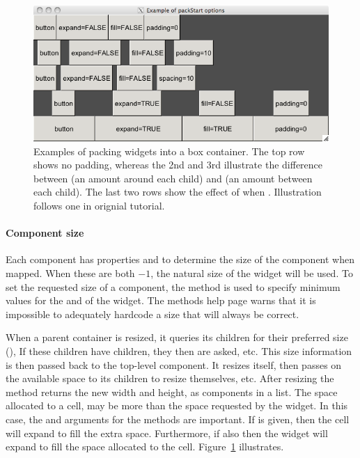 \begin{figure}
  \centering
  \includegraphics[width=.85\textwidth]{ex-RGtk2-pack-start}
  \caption{Examples of packing widgets into a box container. The top
    row shows no padding, whereas the 2nd and 3rd illustrate the
    difference between  (an amount around each child)
    and  (an amount between each child). The last two
    rows show the effect of  when . Illustration
    follows one in orignial \GTK\/ tutorial.}
  \label{fig:RGtk2-pack-start}
\end{figure}




\paragraph{Component size}
Each component has properties  and  to determine the size of the component when mapped. When these are both $-1$, the natural size of the widget will be used. To set the requested size of a component, the method  is used to specify minimum values for the and  of the widget. The methods help page warns that it is impossible to adequately hardcode a size that will always be correct.

When a parent container is resized, it queries its children for their
preferred size (), If these children
have children, they then are asked, etc. This size
information is then passed back to the top-level component. It resizes
itself, then passes on the available space to its children to resize
themselves, etc. After resizing the 
method returns the new width and height, as components in a list.
The space allocated to a cell, may be more than the space requested by
the widget. In this case, the  and
 arguments for the  methods
are important. If  is given, then the cell will
expand to fill the extra space. Furthermore, if also  then
the widget will expand to fill the space allocated to the cell.
Figure~\ref{fig:RGtk2-pack-start} illustrates.


